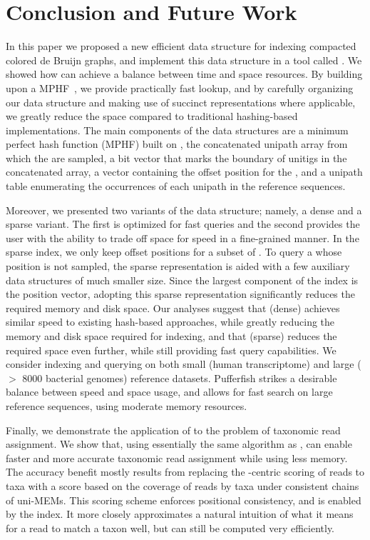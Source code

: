 \section{Conclusion and Future Work}
In this paper we proposed a new efficient data structure for indexing compacted colored de Bruijn graphs, and implement this data structure in a tool called \pufferfish. We showed how \pufferfish can achieve a balance between time and space resources. By building upon a MPHF~\citep{limasset2017fast}, we provide practically fast \kmer lookup, and by carefully organizing our data structure and making use of succinct representations where applicable, we greatly reduce the space compared to traditional hashing-based implementations. The main components of the data structures are a minimum perfect hash function (MPHF) built on \kmers, the concatenated unipath array from which the \kmers are sampled, a bit vector that marks the boundary of unitigs in the concatenated array, a vector containing the offset position for the \kmers, and a unipath table enumerating the occurrences of each unipath in the reference sequences.

Moreover, we presented two variants of the \pufferfish data structure; namely, a dense and a sparse variant. The first is optimized for fast queries and the second provides the user with the ability to trade off space for speed in a fine-grained manner. In the sparse index, we only keep offset positions for a subset of \kmers. To query a \kmer whose position is not sampled, the sparse representation is aided with a few auxiliary data structures of much smaller size. Since the largest component of the index is the position vector, adopting this sparse representation significantly reduces the required memory and disk space. Our analyses suggest that \pufferfish (dense) achieves similar speed to existing hash-based approaches, while greatly reducing the memory and disk space required for indexing, and that \pufferfish (sparse) reduces the required space even further, while still providing fast query capabilities. We consider indexing and querying on both small (human transcriptome) and large ($>$ 8000 bacterial genomes) reference datasets. Pufferfish strikes a desirable balance between speed and space usage, and allows for fast search on large reference sequences, using moderate memory resources.

Finally, we demonstrate the application of \pufferfish to the problem of taxonomic read assignment.  We show that, using essentially the same algorithm as \kraken, \pufferfish can enable faster and more accurate taxonomic read assignment while using less memory.  The accuracy benefit mostly results from replacing the \kmer-centric scoring of reads to taxa with a score based on the coverage of reads by taxa under consistent chains of uni-MEMs.  This scoring scheme enforces positional consistency, and is enabled by the \pufferfish index.  It more closely approximates a natural intuition of what it means for a read to match a taxon well, but can still be computed very efficiently.

